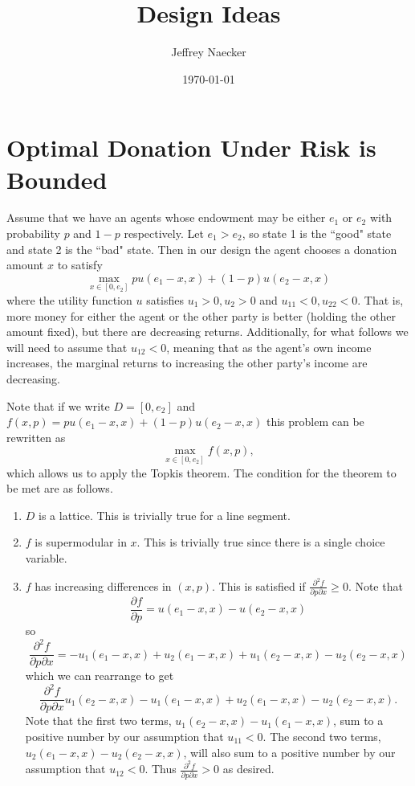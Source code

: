 \documentclass[11pt]{article}
\title{Design Ideas}
\author{Jeffrey Naecker}
\date{\today}
\begin{document}
\maketitle

\section{Optimal Donation Under Risk is Bounded}

Assume that we have an agents whose endowment may be either $e_1$ or $e_2$ with probability $p$ and $1-p$ respectively.  Let $e_1 > e_2$, so state 1 is the ``good" state and state 2 is the ``bad" state.  Then in our design the agent chooses a donation amount $x$ to satisfy
\[
\max_{x \in [0, e_2]} p u(e_1 - x, x) + (1-p) u(e_2 - x, x)
\]
where the utility function $u$ satisfies $u_1>0, u_2>0$ and $u_{11}<0, u_{22}<0$.  That is, more money for either the agent or the other party is better (holding the other amount fixed), but there are decreasing returns.  Additionally, for what follows we will need to assume that $u_{12} < 0$, meaning that as the agent's own income increases, the marginal returns to increasing the other party's income are decreasing.

Note that if we write $D =  [0, e_2]$ and $f(x, p) = p u(e_1 - x, x) + (1-p) u(e_2 - x, x)$ this problem can be rewritten as
\[
\max_{x \in [0, e_2]} f(x, p),
\]
which allows us to apply the Topkis theorem.  The condition for the theorem to be met are as follows.

\begin{enumerate}

\item $D$ is a lattice.  This is trivially true for a line segment.

\item $f$ is supermodular in $x$.  This is trivially true since there is a single choice variable.

\item $f$ has increasing differences in $(x, p)$.  This is satisfied if $\frac{\partial^2 f}{\partial p \partial x} \geq 0$.  Note that 
\[
\frac{\partial f}{\partial p} = u(e_1 - x, x) - u(e_2 - x, x) 
\]
so 
\[
\frac{\partial^2 f}{\partial p \partial x} = -u_1(e_1 - x, x) + u_2(e_1 - x, x) + u_1(e_2 - x, x) - u_2(e_2 - x, x) 
\]
which we can rearrange to get
\[
\frac{\partial^2 f}{\partial p \partial x}   u_1(e_2 - x, x) -u_1(e_1 - x, x) + u_2(e_1 - x, x) - u_2(e_2 - x, x)  .
\]
Note that the first two terms, $u_1(e_2 - x, x) -u_1(e_1 - x, x)$, sum to a positive number by our assumption that $u_{11} < 0$.  The second two terms, $u_2(e_1 - x, x) - u_2(e_2 - x, x)$, will also sum to a positive number by our assumption that $u_{12} < 0$.  Thus $\frac{\partial^2 f}{\partial p \partial x} > 0$ as desired.
\end{enumerate}
\end{document}
